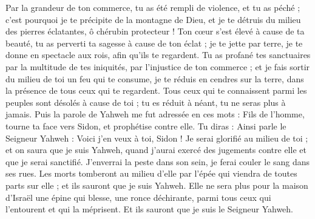 \begin{multicols}{2}
Par la grandeur de ton commerce, tu as été rempli de violence, et tu as péché ; c'est pourquoi je te précipite de la montagne de Dieu, et je te détruis du milieu des pierres éclatantes, ô chérubin protecteur !
Ton cœur s'est élevé à cause de ta beauté, tu as perverti ta sagesse à cause de ton éclat ; je te jette par terre, je te donne en spectacle aux rois, afin qu'ils te regardent.
Tu as profané tes sanctuaires par la multitude de tes iniquités, par l’injustice de ton commerce ; et je fais sortir du milieu de toi un feu qui te consume, je te réduis en cendres sur la terre, dans la présence de tous ceux qui te regardent.
Tous ceux qui te connaissent parmi les peuples sont désolés à cause de toi ; tu es réduit à néant, tu ne seras plus à jamais.
Puis la parole de Yahweh me fut adressée en ces mots :
Fils de l’homme, tourne ta face vers Sidon, et prophétise contre elle.
Tu diras : Ainsi parle le Seigneur Yahweh : Voici j'en veux à toi, Sidon ! Je serai glorifié au milieu de toi ; et on saura que je suis Yahweh, quand j'aurai exercé des jugements contre elle et que je serai sanctifié.
J'enverrai la peste dans son sein, je ferai couler le sang dans ses rues. Les morts tomberont au milieu d'elle par l'épée qui viendra de toutes parts sur elle ; et ils sauront que je suis Yahweh.
Elle ne sera plus pour la maison d’Israël une épine qui blesse, une ronce déchirante, parmi tous ceux qui l’entourent et qui la méprisent. Et ils sauront que je suis le Seigneur Yahweh.

\end{multicols}
